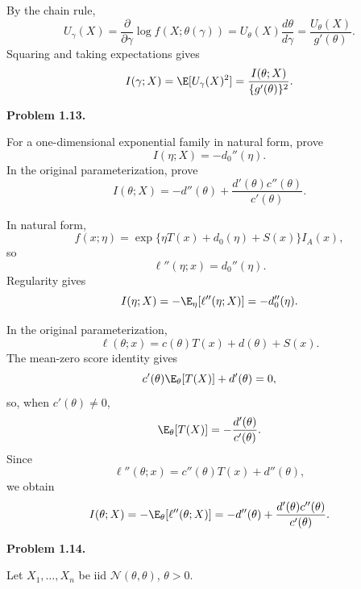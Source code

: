 \documentclass[answers,12pt,addpoints]{exam}
\begin{document}
\begin{questions}
\begin{solution}
By the chain rule,
\[
U_\gamma(X)
=\frac{\partial}{\partial\gamma}\log f(X;\theta(\gamma))
=U_\theta(X)\frac{d\theta}{d\gamma}
=\frac{U_\theta(X)}{g'(\theta)}.
\]
Squaring and taking expectations gives
\[
I(\gamma;X)
=\E[U_\gamma(X)^2]
=\frac{I(\theta;X)}{\{g'(\theta)\}^2}.
\]
\end{solution}

\question[0] \textbf{Problem 1.13.}

For a one-dimensional exponential family in natural form, prove
\[
I(\eta;X)=-d_0''(\eta).
\]
In the original parameterization, prove
\[
I(\theta;X)
=-d''(\theta)+\frac{d'(\theta)c''(\theta)}{c'(\theta)}.
\]

\begin{solution}
In natural form,
\[
f(x;\eta)
=\exp\{\eta T(x)+d_0(\eta)+S(x)\}I_A(x),
\]
so
\[
\ell''(\eta;x)=d_0''(\eta).
\]
Regularity gives
\[
I(\eta;X)=-\E_\eta[\ell''(\eta;X)]=-d_0''(\eta).
\]

In the original parameterization,
\[
\ell(\theta;x)=c(\theta)T(x)+d(\theta)+S(x).
\]
The mean-zero score identity gives
\[
c'(\theta)\E_\theta[T(X)]+d'(\theta)=0,
\]
so, when $c'(\theta)\ne0$,
\[
\E_\theta[T(X)]=-\frac{d'(\theta)}{c'(\theta)}.
\]
Since
\[
\ell''(\theta;x)=c''(\theta)T(x)+d''(\theta),
\]
we obtain
\[
I(\theta;X)
=-\E_\theta[\ell''(\theta;X)]
=-d''(\theta)+\frac{d'(\theta)c''(\theta)}{c'(\theta)}.
\]
\end{solution}

\question[0] \textbf{Problem 1.14.}

Let $X_1,\ldots,X_n$ be iid $\mathcal{N}(\theta,\theta)$, $\theta>0$.


\end{questions}
\end{document}
